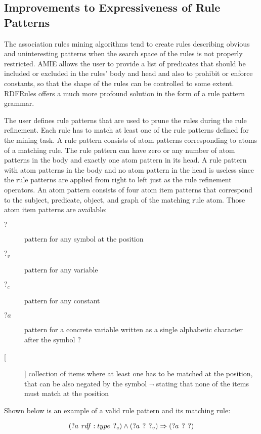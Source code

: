 \subsection{Improvements to Expressiveness of Rule Patterns\label{patterns}}

The association rules mining algorithms tend to create rules describing obvious and uninteresting patterns when the search space of the rules is not properly restricted. AMIE allows the user to provide a list of predicates that should be included or excluded in the rules' body and head and also to prohibit or enforce constants, so that the shape of the rules can be controlled to some extent. RDFRules offers a much more profound solution in the form of a rule pattern grammar. 

The user defines rule patterns that are used to prune the rules during the rule refinement. Each rule has to match at least one of the rule patterns defined for the mining task. A rule pattern consists of atom patterns corresponding to atoms of a matching rule. The rule pattern can have zero or any number of atom patterns in the body and exactly one atom pattern in its head. A rule pattern with atom patterns in the body and no atom pattern in the head is useless since the rule patterns are applied from right to left just as the rule refinement operators. An atom pattern consists of four atom item patterns that correspond to the subject, predicate, object, and graph of the matching rule atom. Those atom item patterns are available:

\begin{description}
\item[$?$] pattern for any symbol at the position
\item[$?_{v}$] pattern for any variable
\item[$?_{c}$] pattern for any constant
\item[$?a$] pattern for a concrete variable written as a single alphabetic character after the symbol $?$ 
\item[[]] collection of items where at least one has to be matched at the position, that can be also negated by the symbol $\neg$ stating that none of the items must match at the position
\end{description}

Shown below is an example of a valid rule pattern and its matching rule:

$$(?a\hspace{0.4em} rdf:type \hspace{0.4em}?_{c}) \land (?a\hspace{0.4em} ? \hspace{0.4em}?_{v}) \Rightarrow (?a\hspace{0.4em}? \hspace{0.4em}?)$$


